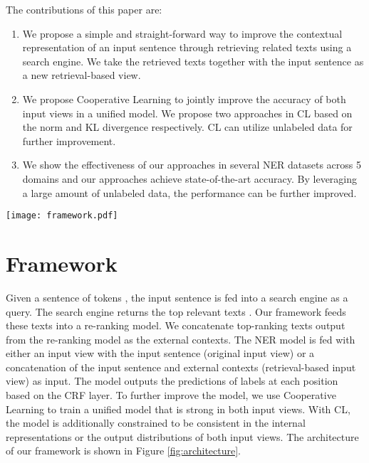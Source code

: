 \documentclass[11pt,a4paper]{article}
\begin{document}
The contributions of this paper are:
\begin{enumerate}[leftmargin=*]
    \item We propose a simple and straight-forward way to improve the contextual representation of an input sentence through retrieving related texts using a search engine. We take the retrieved texts together with the input sentence as a new retrieval-based view.
    \item 
We propose Cooperative Learning to jointly improve the accuracy of both input views in a unified model. We propose two approaches in CL based on the  norm and KL divergence respectively. CL can utilize unlabeled data for further improvement.
\item We show the effectiveness of our approaches in several NER datasets across 5 domains and our approaches achieve state-of-the-art accuracy. By leveraging a large amount of unlabeled data, the performance can be further improved. \end{enumerate}
\begin{figure*}[ht]
	\centering
	\texttt{[image: framework.pdf]}
	\caption{The architecture of our framework. An input sentence  is fed into a search engine to get  related texts. The related texts are then fed into the re-ranking module. The framework selects  highest ranking related texts output from the re-ranking module and feeds the texts to a transformer-based model together with the input sentence. Finally, we calculate the negative likelihood loss  and  together with the CL loss (either  or ).}
	\label{fig:architecture}
\end{figure*}

\section{Framework}
Given a sentence of  tokens , the input sentence is fed into a search engine as a query. The search engine returns the top  relevant texts . Our framework feeds these texts into a re-ranking model. We concatenate  top-ranking texts output from the re-ranking model as the external contexts. The NER model is fed with either an input view with the input sentence (original input view) or a concatenation of the input sentence and external contexts (retrieval-based input view) as input. The model outputs the predictions of labels  at each position based on the CRF layer. To further improve the model, we use Cooperative Learning to train a unified model that is strong in both input views. With CL, the model is additionally constrained to be consistent in the internal representations or the output distributions of both input views. The architecture of our framework is shown in Figure \ref{fig:architecture}.
\end{document}
